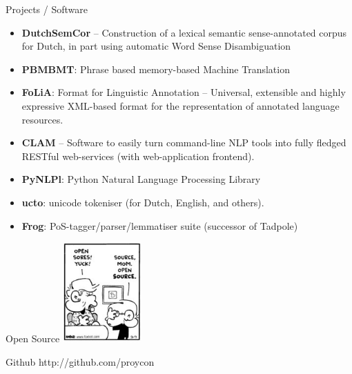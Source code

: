 \documentclass[compress]{beamer}
\begin{document}
\begin{frame}

	\begin{block}{Projects / Software}
		\begin{itemize}
			\item \textbf{DutchSemCor} -- Construction of a lexical semantic sense-annotated corpus for Dutch, in part using automatic Word Sense Disambiguation  \\
			\item \textbf{PBMBMT}: Phrase based memory-based Machine Translation  \\
			\item \textbf{FoLiA}: Format for Linguistic Annotation -- Universal, extensible and highly expressive XML-based format for the representation of annotated language resources. \\
			\item \textbf{CLAM} -- Software to easily turn command-line NLP tools into fully fledged RESTful web-services (with web-application frontend).  \\
			\item \textbf{PyNLPl}: Python Natural Language Processing Library \\
			\item \textbf{ucto}: unicode tokeniser (for Dutch, English, and others). \\
			\item \textbf{Frog}: PoS-tagger/parser/lemmatiser suite (successor of Tadpole) \\
		\end{itemize}
	\end{block}
\end{frame}

\begin{frame}
	\begin{block}{Open Source}
		\includegraphics[width=3cm]{opensource.jpg}\FloatBarrier
	\end{block}

	\begin{block}{Github}
		http://github.com/proycon
	\end{block}
\end{frame}
\end{document}
